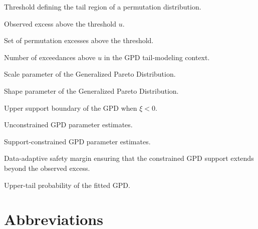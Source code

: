 \notationsettings{2cm}
\begin{notationlist}
	\item[$u$] Threshold defining the tail region of a permutation distribution.
	
	\item[$Y_{\mathrm{obs}}$] Observed excess above the threshold $u$.
	
	\item[$\mathcal{Y} = \{Y_b^\ast\}$] Set of permutation excesses above the threshold.
	
	\item[$k$] Number of exceedances above $u$ in the GPD tail-modeling context.
	
	\item[$\sigma$] Scale parameter of the Generalized Pareto Distribution.
	
	\item[$\xi$] Shape parameter of the Generalized Pareto Distribution.
	
	\item[$s = -\sigma/\xi$] Upper support boundary of the GPD when $\xi < 0$.
	
	\item[$\hat{\sigma}_{(U)}, \hat{\xi}_{(U)}$] Unconstrained GPD parameter estimates.
	
	\item[$\hat{\sigma}_{(C)}, \hat{\xi}_{(C)}$] Support-constrained GPD parameter estimates.
	
	\item[$\varepsilon$] Data-adaptive safety margin ensuring that the constrained GPD support extends beyond the observed excess.
	
	\item[$\bar{F}_{\mathrm{GPD}}(\cdot)$] Upper-tail probability of the fitted GPD.
\end{notationlist}


\section{Abbreviations}

